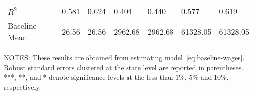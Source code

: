 \begin{table}[H]
\begin{tabular}{@{}lllllll@{}}
        $R^2$             & 0.581     & 0.624     & 0.404     & 0.440     & 0.577     & 0.619     \\
        Baseline Mean     & 26.56     & 26.56     & 2962.68   & 2962.68   & 61328.05  & 61328.05  \\ \bottomrule \bottomrule
    \end{tabular}
    \begin{minipage}{\columnwidth}
        \vspace{0.05in}
        \tiny NOTES: These results are obtained from estimating model~\ref{eq:baseline-wages}. Robust standard errors clustered at the state level are reported in parentheses. ***, **, and * denote significance levels at the less than $1\%$, $5\%$ and $10\%$, respectively.
    \end{minipage}
\end{table}